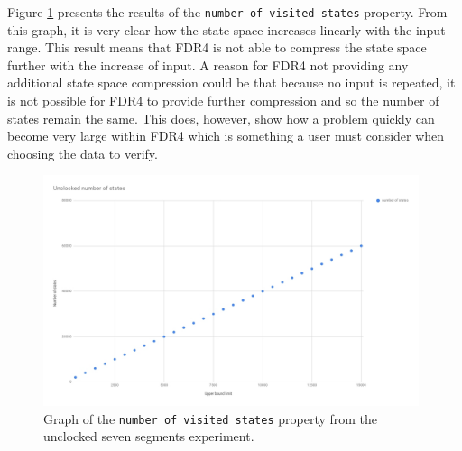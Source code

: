 Figure \ref{fig:unclocked_states} presents the results of the \texttt{number of visited states} property. From this graph, it is very clear how the state space increases linearly with the input range. This result means that FDR4 is not able to compress the state space further with the increase of input. A reason for FDR4 not providing any additional state space compression could be that because no input is repeated, it is not possible for FDR4 to provide further compression and so the number of states remain the same. This does, however, show how a problem quickly can become very large within FDR4 which is something a user must consider when choosing the data to verify.
\begin{figure}
    \includegraphics[width=0.98\textwidth]{./figures/temporary_figures/unclocked_number_of_states.jpg}
\caption{Graph of the \texttt{number of visited states} property from the unclocked seven segments experiment.}
\label{fig:unclocked_states}
\end{figure}
